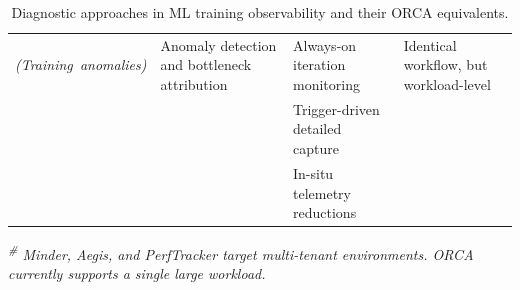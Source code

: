 {\begin{table}[t]
\begin{tabularx}{1\textwidth}{p{1.0in} p{1.5in} Y Y }
{      \emph{(Training~anomalies)}}                                            & Anomaly detection and bottleneck attribution                                            & Always-on iteration
      monitoring                                                              & Identical workflow, but workload-level                                                                                                                                                                                               \\
                                                                              &                                                                                         & Trigger-driven detailed capture                       &                                                                \\
      \addlinespace
                                                                              &                                                                                         & In-situ telemetry reductions                          &                                                                \\
      \bottomrule
    \end{tabularx}
    {\raggedright\scriptsize\itshape \textsuperscript{\#} Minder, Aegis, and PerfTracker target multi-tenant environments. ORCA currently supports a single large workload.\par}
    \caption{Diagnostic approaches in ML training observability and their ORCA equivalents.}~\label{tab:orca:related-work-old}
  \end{table}
}

\newlength{\tabOrcaYwidth}
\setlength{\tabOrcaYwidth}{1.8in}

\newcommand{\tabOrcaRelatedInner}[1]{%
  \begin{tabular}
    [t]{@{}>{\raggedright\arraybackslash}p{1.15in}>{\raggedright\arraybackslash}p{1.75in}>{\raggedright\arraybackslash}p{1.8in}@{}}
    #1
  \end{tabular}%
}

\newcommand{\tabOrcaGreyhound}{%
  \tabOrcaRelatedInner{
    \textbullet~Iteration boundaries & \textbullet~Autocorrelation over collectives & \textbullet~\texttt{PostTimestepAdvance} \\
    \textbullet~Fail-slow detection & \textbullet~Track iteration times & \textbullet~Track iteration times \\
    \textbullet~Straggler localization & \textbullet~Aggregate NCCL events (off-fabric) & \textbullet~\texttt{GROUPBY swid} (on-fabric) \\
    \textbullet~Cause identification & \textbullet~Microbenchmarks & \textbullet~Microbenchmarks or trace events \\
    \textbullet~Online interventions & \textbullet~Tune micro-batch distribution \textbullet~Tune~parallelism & \textbullet~Supported via control plane \\
  }%
}

